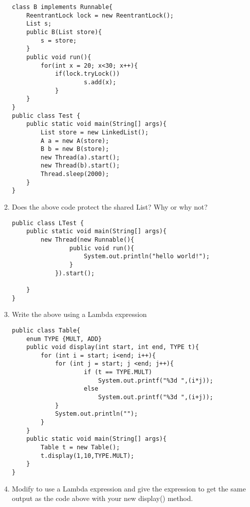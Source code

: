 \documentclass{article}
\begin{document}
\begin{enumerate}
\begin{lstlisting}
class B implements Runnable{
 	ReentrantLock lock = new ReentrantLock();
 	List s;
 	public B(List store){
 		s = store;
 	}
 	public void run(){
  		for(int x = 20; x<30; x++){
   			if(lock.tryLock())
    				s.add(x);
    		}
 	}
}
public class Test {
 	public static void main(String[] args){
  		List store = new LinkedList();
  		A a = new A(store);
  		B b = new B(store);
  		new Thread(a).start();
  		new Thread(b).start();
  		Thread.sleep(2000);
 	}
}
\end{lstlisting}
	\item Does the above code protect the shared List? Why or why not?
	\newpage
\begin{lstlisting}
public class LTest {
 	public static void main(String[] args){
  		new Thread(new Runnable(){
     			public void run(){
      				System.out.println("hello world!");
     			}
     		}).start();
 
 	}
}
\end{lstlisting}
	\item Write the above using a Lambda expression\newpage
\begin{lstlisting}
public class Table{
 	enum TYPE {MULT, ADD}
 	public void display(int start, int end, TYPE t){
  		for (int i = start; i<end; i++){
   			for (int j = start; j <end; j++){
    				if (t == TYPE.MULT)
     					System.out.printf("%3d ",(i*j));
    				else 
     					System.out.printf("%3d ",(i+j));
   			}
   			System.out.println("");
  		}
 	}
 	public static void main(String[] args){
  		Table t = new Table();
  		t.display(1,10,TYPE.MULT);
 	}
}
\end{lstlisting}
	\item Modify to use a Lambda expression and give the expression to get the same output as the code above with your new display() method.
\end{enumerate}
\end{document}
